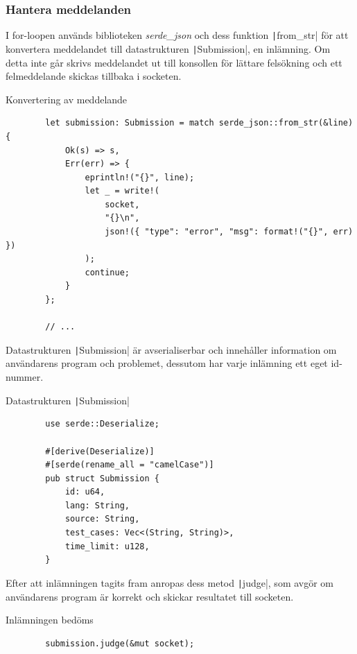 \documentclass{article}
\begin{document}
\subsubsection{Hantera meddelanden}

I for-loopen används biblioteken \textit{serde\_json} och dess funktion
\texttt|from_str| för att konvertera meddelandet till datastrukturen
\texttt|Submission|, en inlämning. Om detta inte går skrivs meddelandet ut till
konsollen för lättare felsökning och ett felmeddelande skickas tillbaka i
socketen.

\begin{listing}[H]
	\caption{Konvertering av meddelande}
	\begin{verbatim}
		let submission: Submission = match serde_json::from_str(&line) {
			Ok(s) => s,
			Err(err) => {
				eprintln!("{}", line);
				let _ = write!(
					socket,
					"{}\n",
					json!({ "type": "error", "msg": format!("{}", err) })
				);
				continue;
			}
		};

		// ...
	\end{verbatim}
\end{listing}

Datastrukturen \texttt|Submission| är avserialiserbar och innehåller information
om användarens program och problemet, dessutom har varje inlämning ett eget
id-nummer.

\begin{listing}[H]
	\caption{Datastrukturen \texttt|Submission|}
	\begin{verbatim}
		use serde::Deserialize;

		#[derive(Deserialize)]
		#[serde(rename_all = "camelCase")]
		pub struct Submission {
			id: u64,
			lang: String,
			source: String,
			test_cases: Vec<(String, String)>,
			time_limit: u128,
		}
	\end{verbatim}
\end{listing}

Efter att inlämningen tagits fram anropas dess metod
\texttt|judge|, som avgör
om användarens program är korrekt och skickar resultatet till socketen.

\begin{listing}[H]
	\caption{Inlämningen bedöms \label{call-judge}}
	\begin{verbatim}
        submission.judge(&mut socket);
	\end{verbatim}
\end{listing}
\end{document}
